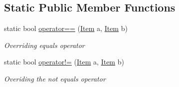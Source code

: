 \subsection*{Static Public Member Functions}
\begin{DoxyCompactItemize}
\item 
static bool \hyperlink{struct_bee_game_1_1_items_1_1_item_a33e02e23b17caf1ab0f6ff9c6ee3dd89}{operator==} (\hyperlink{struct_bee_game_1_1_items_1_1_item}{Item} a, \hyperlink{struct_bee_game_1_1_items_1_1_item}{Item} b)
\begin{DoxyCompactList}\small\item\em Overriding equals operator \end{DoxyCompactList}\item 
static bool \hyperlink{struct_bee_game_1_1_items_1_1_item_aedf7a9ae2db756f3351e5931dd0e2ee1}{operator!=} (\hyperlink{struct_bee_game_1_1_items_1_1_item}{Item} a, \hyperlink{struct_bee_game_1_1_items_1_1_item}{Item} b)
\begin{DoxyCompactList}\small\item\em Overiding the not equals operator \end{DoxyCompactList}\end{DoxyCompactItemize}
